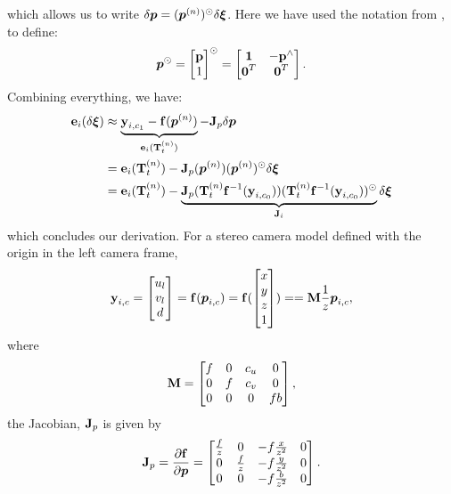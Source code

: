 which allows us to write $\delta \boldsymbol{p} = (\boldsymbol{p}^{(n)})^\odot \delta\boldsymbol{\mathbf{\xi}}$. Here we have used the notation from \cite{Barfoot2017-ri}, to define:
\begin{equation}
\boldsymbol{p}^\odot = \begin{bmatrix} \boldsymbol{\mathbf{p}} \\ 1 \end{bmatrix}^\odot = \begin{bmatrix} \boldsymbol{\mathbf{1}} & -\boldsymbol{\mathbf{p}}^\wedge \\ \boldsymbol{\mathbf{0}}^T & \boldsymbol{\mathbf{0}}^T\end{bmatrix}.
\end{equation}
Combining everything, we have:
\begin{align}
	\boldsymbol{\mathbf{e}}_i (\delta \boldsymbol{\mathbf{\xi}})  &\approx \underbrace{\boldsymbol{\mathbf{y}}_{i, c_1} - \boldsymbol{\mathbf{f}}(\boldsymbol{p}^{(n)})}_{\boldsymbol{\mathbf{e}}_i(\boldsymbol{\mathbf{T}}_t^{(n)})} -  \boldsymbol{\mathbf{J}}_p \delta \boldsymbol{p}\\
	&=  \boldsymbol{\mathbf{e}}_i(\boldsymbol{\mathbf{T}}_t^{(n)}) - \boldsymbol{\mathbf{J}}_p(\boldsymbol{p}^{(n)}) (\boldsymbol{p}^{(n)})^\odot \delta\boldsymbol{\mathbf{\xi}} \\ 
	&=  \boldsymbol{\mathbf{e}}_i(\boldsymbol{\mathbf{T}}_t^{(n)}) - \underbrace{\boldsymbol{\mathbf{J}}_p( \boldsymbol{\mathbf{T}}_t^{(n)} 
    \boldsymbol{\mathbf{f}}^{-1}(\boldsymbol{\mathbf{y}}_{i, c_0})) ( \boldsymbol{\mathbf{T}}_t^{(n)} 
    \boldsymbol{\mathbf{f}}^{-1}(\boldsymbol{\mathbf{y}}_{i, c_0}))^\odot}_{\boldsymbol{\mathbf{J}}_i} \delta\boldsymbol{\mathbf{\xi}} 
\end{align}
which concludes our derivation. For a stereo camera model defined with the origin in the left camera frame,
 \begin{equation}
	\boldsymbol{\mathbf{y}}_{i, c} = \begin{bmatrix} u_l \\ v_l \\ d  \end{bmatrix}  
  =\boldsymbol{\mathbf{f}}(\boldsymbol{p}_{i,c}) =  \boldsymbol{\mathbf{f}}(\begin{bmatrix} x \\ y \\ z \\ 1 \end{bmatrix}) = 
  = \boldsymbol{\mathbf{M}} \frac{1}{z} \boldsymbol{p}_{i,c},
\end{equation}
where
\begin{equation}
\boldsymbol{\mathbf{M}} = \begin{bmatrix} f & 0 & c_u & 0 \\ 0 & f & c_v & 0 \\ 0 & 0 & 0 & fb \end{bmatrix},
\end{equation}
the Jacobian, $\boldsymbol{\mathbf{J}}_p$ is given by
\begin{equation}
\boldsymbol{\mathbf{J}}_p = \dfrac{\partial \boldsymbol{\mathbf{f}}}{\partial \boldsymbol{p}} = \begin{bmatrix} \frac{f}{z} & 0 & -f \frac{x}{z^2} & 0 \\ 0 & \frac{f}{z} & -f \frac{y}{z^2} & 0 \\ 0 & 0 & -f \frac{b}{z^2} & 0 \end{bmatrix}.
\end{equation}




 